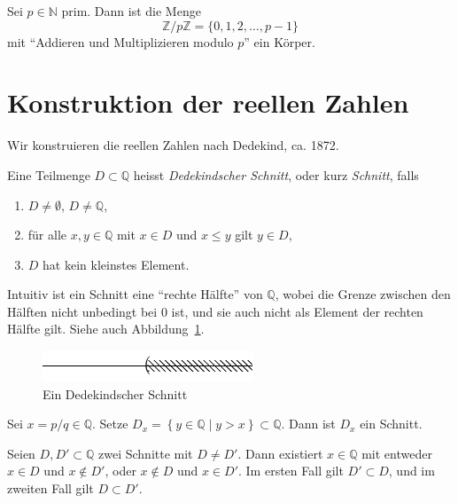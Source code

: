\documentclass[../main.tex]{subfiles}
\begin{document}
\begin{ausblick}[Algebra]
  Sei $p \in \mathbb N$ prim. Dann ist die Menge
  \[ \mathbb Z / p \mathbb Z = \{0, 1, 2, \dots, p-1\}\]
  mit ``Addieren und Multiplizieren modulo $p$'' ein Körper.
\end{ausblick}

\section{Konstruktion der reellen Zahlen}
Wir konstruieren die reellen Zahlen nach Dedekind, ca. 1872.
\begin{definition}
  Eine Teilmenge $D \subset \mathbb Q$ heisst
  \textit{Dedekindscher Schnitt}, oder kurz \textit{Schnitt},
  falls
  \begin{enumerate}[(1)]
    \item $D \neq \emptyset$, $D \neq \mathbb Q$,
    \item für alle $x, y \in \mathbb Q$ mit $x \in D$ und $x \leq y$ gilt $y \in D$,
    \item $D$ hat kein kleinstes Element.
  \end{enumerate}
\end{definition}

Intuitiv ist ein Schnitt eine ``rechte Hälfte'' von $\mathbb Q$, wobei
die Grenze
zwischen den Hälften
nicht unbedingt bei $0$ ist, und sie auch nicht als Element der
rechten Hälfte gilt. Siehe auch Abbildung~\ref{fig:schnitt}.

\begin{figure}[htb]
  \centering
  \includegraphics{images/dedekind-schnitt}
  \caption{Ein Dedekindscher Schnitt}%
  \label{fig:schnitt}
\end{figure}

\begin{example}
  Sei $x = p/q \in \mathbb Q$. Setze $D_{x} = \left\{y \in \mathbb Q \mid y > x\right\}
  \subset \mathbb Q$.
  Dann ist $D_{x}$ ein Schnitt.
\end{example}

\begin{remark}
  Seien $D, D' \subset \mathbb Q$ zwei Schnitte mit $D \neq D'$.
  Dann existiert $x \in \mathbb Q$ mit entweder $x \in D$ und $x \notin D'$,
  oder $x \notin D$ und $x \in D'$.
  Im ersten Fall gilt $D' \subset D$, und im zweiten Fall gilt $D \subset D'$.
\end{remark}
\end{document}
